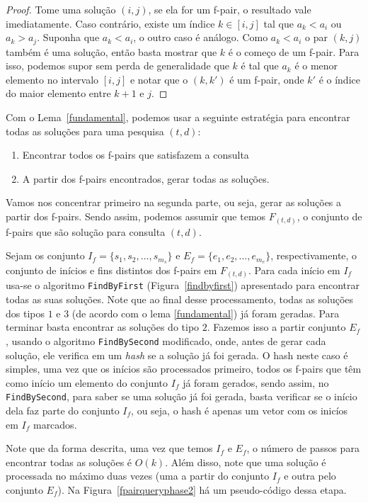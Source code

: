 \documentclass[12pt]{article}
\begin{document}
\begin{proof}
Tome uma solução $(i, j)$, se ela for um f-pair, o resultado vale imediatamente.
Caso contrário, existe um índice $k \in [i, j]$ tal que $a_k < a_i$ ou $a_k > a_j$.
Suponha que $a_k < a_i$, o outro caso é análogo. Como $a_k < a_i$ o par $(k, j)$ também
é uma solução, então basta mostrar que $k$ é o começo de um f-pair. Para isso, podemos
supor sem perda de generalidade que $k$ é tal que $a_k$ é o menor elemento no intervalo
$[i, j]$ e notar que o $(k, k')$ é um f-pair, onde $k'$ é o índice do maior elemento entre $k + 1$ e $j$.
\end{proof}

Com o Lema~\ref{fundamental}, podemos usar a seguinte estratégia 
para encontrar todas as soluções para uma pesquisa $(t,d)$:

\begin{enumerate}
\item Encontrar todos os f-pairs que satisfazem a consulta 
\item A partir dos f-pairs encontrados, gerar todas as soluções.
\end{enumerate}

Vamos nos concentrar primeiro na segunda parte, ou seja, gerar as soluções
a partir dos f-pairs. Sendo assim, podemos assumir que temos 
$F_{(t,d)}$, o conjunto de f-pairs que são solução para
consulta $(t,d)$. 

Sejam os conjunto $I_f = \{s_1, s_2, \ldots, s_{m_s}\}$
e $E_f = \{e_1, e_2, \ldots, e_{m_e}\}$, respectivamente, o conjunto de inícios e fins distintos
dos f-pairs em $F_{(t,d)}$. Para cada início em $I_f$ usa-se o algoritmo \verb|FindByFirst| (Figura~\ref{findbyfirst})
apresentado para encontrar todas as suas soluções.  Note que ao final desse processamento, todas
as soluções dos tipos $1$ e $3$ (de acordo com o lema \ref{fundamental}) já foram geradas. Para terminar
basta encontrar as soluções do tipo $2$. Fazemos isso  a partir conjunto $E_f$, usando o algoritmo
\verb|FindBySecond| modificado, onde, antes de gerar cada solução, ele verifica em um \textit{hash} se a solução
já foi gerada. O hash neste caso é simples, uma vez que os inícios são processados primeiro, todos os
f-pairs que têm como início um elemento do conjunto $I_f$ já foram gerados, sendo assim, no \verb|FindBySecond|,
para saber se uma solução já foi gerada, basta verificar se o início dela faz parte do conjunto $I_f$, ou seja,
o hash é apenas um vetor com os inicíos em $I_f$ marcados.

Note que da forma descrita, uma vez que temos $I_f$ e $E_f$, o número de passos para encontrar todas as soluções é $O(k)$.
Além disso, note que uma solução é processada no máximo duas vezes (uma a partir do conjunto $I_f$ e outra pelo conjunto $E_f$).
Na Figura~\ref{fpairqueryphase2} há um pseudo-código dessa etapa.
\end{document}
